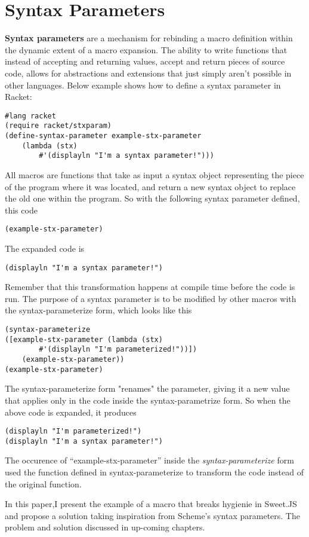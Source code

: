 \section{Syntax Parameters}
\textbf{Syntax parameters} are a mechanism for rebinding a macro definition within the dynamic extent of a macro expansion. The ability to write functions that instead of accepting and returning values, accept and return pieces of source code, allows for abstractions and extensions that just simply aren't possible in other languages. Below example shows how to define a syntax parameter in Racket:
\begin{lstlisting}[frame=single]
#lang racket
(require racket/stxparam)
(define-syntax-parameter example-stx-parameter
    (lambda (stx)
        #'(displayln "I'm a syntax parameter!")))
\end{lstlisting}        
All macros are functions that take as input a syntax object representing the piece of the program where it was located, and return a new syntax object to replace the old one within the program. So with the following syntax parameter defined, this code
\begin{lstlisting}[frame=single]
(example-stx-parameter)
\end{lstlisting} 
The expanded code is 
\begin{lstlisting}[frame=single]
(displayln "I'm a syntax parameter!")
\end{lstlisting} 
Remember that this transformation happens at compile time before the code is run. The purpose of a syntax parameter is to be modified by other macros with the syntax-parameterize form, which looks like this
\begin{lstlisting}[frame=single]
(syntax-parameterize 
([example-stx-parameter (lambda (stx) 
		#'(displayln "I'm parameterized!"))])
    (example-stx-parameter))
(example-stx-parameter)
\end{lstlisting} 

The syntax-parameterize form "renames" the parameter, giving it a new value that applies only in the code inside the syntax-parametrize form. So when the above code is expanded, it produces

\begin{lstlisting}[frame=single]
(displayln "I'm parameterized!")
(displayln "I'm a syntax parameter!")
\end{lstlisting} 
The occurence of ``example-stx-parameter'' inside the \textit{syntax-parameterize} form used the function defined in syntax-parameterize to transform the code instead of the original function.

In this paper,I present the example of a macro that breaks hygienie in Sweet.JS and propose a solution taking inspiration from Scheme's syntax parameters. The problem and solution discussed in up-coming chapters.

